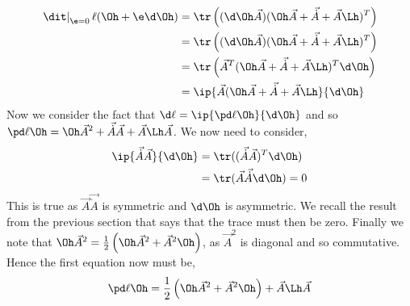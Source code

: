 \begin{align*}
  \left.\dit\right|_{\e = 0}\ell (\Oh + \e\d\Oh) &= \tr\left( (\d\Oh \vec A) (\Oh \vec A + \vec {\dot A} + \vec A\Lh)^T \right)\\
   &= \tr\left( (\d\Oh \vec A) (\Oh \vec A + \vec {\dot A} + \vec A\Lh)^T \right)\\
   &= \tr\left( \vec A^T(\Oh \vec A + \vec {\dot A} + \vec A\Lh)^T\d\Oh \right)\\
   &= \ip{\vec A(\Oh \vec A + \vec {\dot A} + \vec A\Lh}{\d\Oh}
\end{align*}
Now we consider the fact that $\displaystyle{\d\ell = \ip{\pd \ell \Oh}{\d\Oh}}$ and so $\displaystyle{\pd \ell \Oh = \Oh \vec A^2 + \vec {\dot A}\vec A + \vec A\Lh\vec A}$. We now need to consider,
\begin{align*}
  \ip{\vec{\dot A}\vec A}{\d\Oh} &= \tr((\vec{\dot A}\vec A)^T\d\Oh) \\
  &= \tr (\vec A\vec{\dot A}\d\Oh) = 0
\end{align*}
This is true as $\vec A\vec{\dot A}$ is symmetric and $\d\Oh$ is asymmetric. We recall the result from the previous section that says that the trace must then be zero. Finally we note that $\Oh \vec A^2 = \frac{1}{2}\left(\Oh \vec A^2 + \vec A^2\Oh\right)$, as $\vec A^2$ is diagonal and so commutative. Hence the first equation now must be,
\begin{align}
  \pd \ell \Oh = \frac{1}{2}\left(\Oh \vec A^2 + \vec A^2\Oh\right) + \vec A\Lh\vec A
\end{align}

